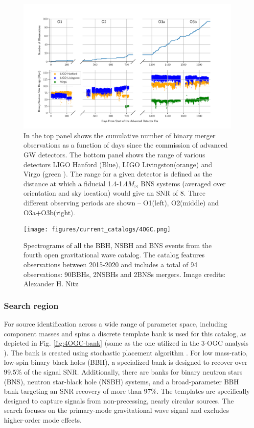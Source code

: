 \begin{figure}
    \centering
    \includegraphics[width=\linewidth]{figures/current_catalogs/range.pdf}
    \caption{In the top panel shows the cumulative number of binary merger observations as a function of days since the commission of advanced GW detectors. The bottom panel shows the range of various detectors LIGO Hanford (Blue), LIGO Livingston(orange) and Virgo (green ). The range for a given detector is defined as the distance at which a fiducial 1.4-1.4$M_{\odot}$ BNS systems (averaged over orientation and sky location) would give an SNR of 8. Three different observing periods are shown -- O1(left), O2(middle) and O3a+O3b(right).}
    \label{fig:4OGC-range}
\end{figure}



\begin{figure}
    \centering
    \texttt{[image: figures/current\_catalogs/4OGC.png]}
    \caption{Spectrograms of all the BBH, NSBH and BNS events from the fourth open gravitational wave catalog. The catalog features observations between 2015-2020 and includes a total of 94 observations: 90BBHs, 2NSBHs and 2BNSs mergers. Image credits: Alexander H. Nitz}
    \label{fig:4OGC-spectrograms}
\end{figure}

\subsubsection{Search region}
For source identification across a wide range of parameter space, including component masses and spins a discrete template bank is used for this catalog, as depicted in Fig. \ref{fig:4OGC-bank} (same as the one utilized in the 3-OGC analysis \cite{Nitz:2021uxj}). The bank is created using stochastic placement algorithm \cite{Harry:2009ea}. For low mass-ratio, low-spin binary black holes (BBH), a specialized bank is designed to recover over 99.5\% of the signal SNR. Additionally, there are banks for binary neutron stars (BNS), neutron star-black hole (NSBH) systems, and a broad-parameter BBH bank targeting an SNR recovery of more than 97\%. The templates are specifically designed to capture signals from non-precessing, nearly circular sources. The search focuses on the primary-mode gravitational wave signal and excludes higher-order mode effects.

